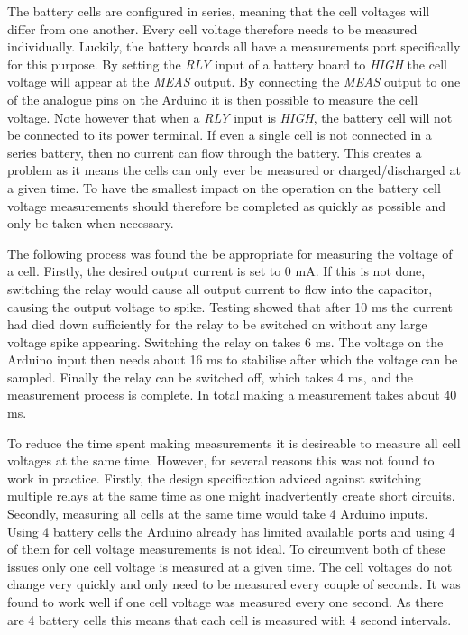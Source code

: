 \documentclass[a4paper]{article}
\begin{document}
The battery cells are configured in series, meaning that the cell voltages will differ from
one another. Every cell voltage therefore needs to be measured individually. Luckily,
the battery boards all have a measurements port specifically for this purpose. By setting
the \emph{RLY} input of a battery board to \emph{HIGH} the cell voltage will appear at the
\emph{MEAS} output. By connecting the \emph{MEAS} output to one of the analogue pins
on the Arduino it is then possible to measure the cell voltage. Note however that when a 
\emph{RLY} input is \emph{HIGH}, the battery cell will not be connected to its power
terminal. If even a single cell is not connected in a series battery, then no current
can flow through the battery. This creates a problem as it means the cells can only 
ever be measured or charged/discharged at a given time. To have the smallest 
impact on the operation on the battery cell voltage measurements should therefore 
be completed as quickly as possible and only be taken when necessary.

The following process was found the be appropriate for measuring the voltage 
of a cell. Firstly, the desired output current is set to 0 mA. If this is not done, 
switching the relay would cause all output current to flow into the capacitor, 
causing the output voltage to spike. Testing showed that after 10 ms the current 
had died down sufficiently for the relay
to be switched on without any large voltage spike appearing. Switching the relay on
takes 6 ms\cite{axicom}. The voltage on the Arduino input then needs about 16 ms to
stabilise after which the voltage can be sampled. Finally the relay can be switched off, which
takes 4 ms, and the measurement process is complete. In total making a measurement takes
about 40 ms. 

To reduce the time spent making measurements it is desireable to measure all cell voltages
at the same time. However, for several reasons this was not found to work in practice. 
Firstly, the design specification adviced against switching multiple relays at the same
time as one might inadvertently create short circuits\cite{energyBrief}. Secondly, measuring
all cells at the same time would take 4 Arduino inputs. Using 4 battery cells the Arduino
already has limited available ports and using 4 of them for cell voltage measurements is not ideal. 
To circumvent both of these issues only one cell voltage is measured at a given time.
The cell voltages do not change very quickly and only need to be measured every couple 
of seconds. It was found to work well if one cell voltage was measured every one second.
As there are 4 battery cells this means that each cell is measured with 4 second intervals.
\end{document}
